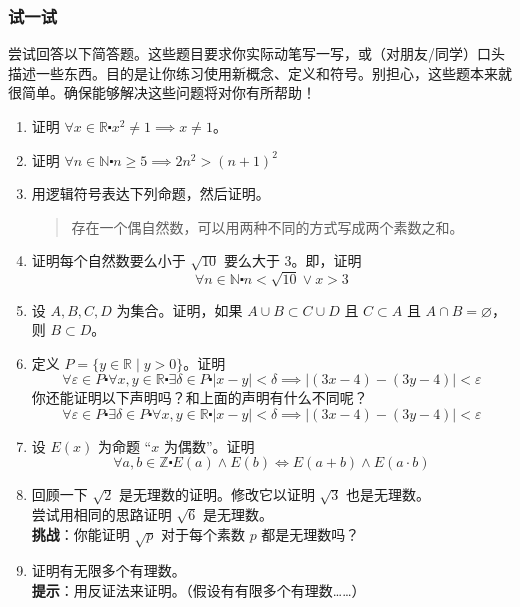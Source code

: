 \subsubsection*{试一试}

尝试回答以下简答题。这些题目要求你实际动笔写一写，或（对朋友/同学）口头描述一些东西。目的是让你练习使用新概念、定义和符号。别担心，这些题本来就很简单。确保能够解决这些问题将对你有所帮助！

\begin{enumerate}[label=(\arabic*)]
    \item 证明 $\forall x \in \mathbb{R} \centerdot x^2 \ne 1 \implies x \ne 1$。
    \item 证明 $\forall n \in \mathbb{N} \centerdot n \ge 5 \implies 2n^2 > (n+1)^2$ \label{ex:exercises4.9.2}
    \item 用逻辑符号表达下列命题，然后证明。
        \begin{quote}
            存在一个偶自然数，可以用两种不同的方式写成两个素数之和。
        \end{quote}
    \item 证明每个自然数要么小于 $\sqrt{10}$ 要么大于 $3$。即，证明
        \[\forall n \in \mathbb{N} \centerdot n<\sqrt{10} \lor x>3\]
    \item 设 $A,B,C,D$ 为集合。证明，如果 $A \cup B \subset C \cup D$ 且 $C \subset A$ 且 $A \cap B = \varnothing$，则 $B \subset D$。
    \item 定义 $P = \{y \in \mathbb{R} \mid y > 0\}$。证明
        \[\forall \varepsilon \in P \centerdot \forall x, y \in \mathbb{R} \centerdot \exists \delta \in P \centerdot |x - y| < \delta \implies |(3x - 4) - (3y - 4)| < \varepsilon\]
        你还能证明以下声明吗？和上面的声明有什么不同呢？
        \[\forall \varepsilon \in P \centerdot \exists \delta \in P \centerdot \forall x, y \in \mathbb{R} \centerdot  |x - y| < \delta \implies |(3x - 4) - (3y - 4)| < \varepsilon\]
    \item 设 $E(x)$ 为命题 ``$x$ 为偶数''。证明
        \[\forall a, b \in \mathbb{Z} \centerdot E(a) \land E(b) \iff E(a + b) \land E(a \cdot b)\]
    \item 回顾一下 $\sqrt{2}$ 是无理数的证明。修改它以证明 $\sqrt{3}$ 也是无理数。\\
        尝试用相同的思路证明 $\sqrt{6}$ 是无理数。\\
        \textbf{挑战}：你能证明 $\sqrt{p}$ 对于每个素数 $p$ 都是无理数吗？
    \item 证明有无限多个有理数。\\
        \textbf{提示}：用反证法来证明。（假设有有限多个有理数……）
\end{enumerate}